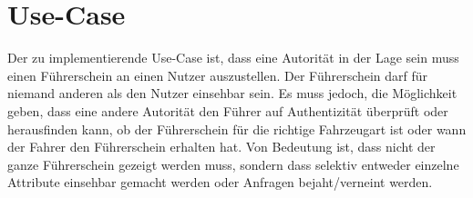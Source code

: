 \section{Use-Case}
Der zu implementierende Use-Case ist, dass eine Autorität in der Lage sein muss einen Führerschein an einen Nutzer auszustellen. Der Führerschein darf für niemand anderen als den Nutzer einsehbar sein. Es muss jedoch, die Möglichkeit geben, dass eine andere Autorität den Führer auf Authentizität überprüft oder herausfinden kann, ob der Führerschein für die richtige Fahrzeugart ist oder wann der Fahrer den Führerschein erhalten hat. Von Bedeutung ist, dass nicht der ganze Führerschein gezeigt werden muss, sondern dass selektiv entweder einzelne Attribute einsehbar gemacht werden oder Anfragen bejaht/verneint werden.